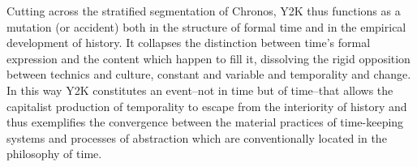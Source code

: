 Cutting across the stratified segmentation of Chronos, Y2K thus functions as a mutation (or accident) both in the structure of formal time and in the empirical development of history. It collapses the distinction between time's formal expression and the content which happen to fill it, dissolving the rigid opposition between technics and culture, constant and variable and temporality and change. In this way Y2K constitutes an event--not in time but of time--that allows the capitalist production of temporality to escape from the interiority of history and thus exemplifies the convergence between the material practices of time-keeping systems and processes of abstraction which are conventionally located in the philosophy of time.